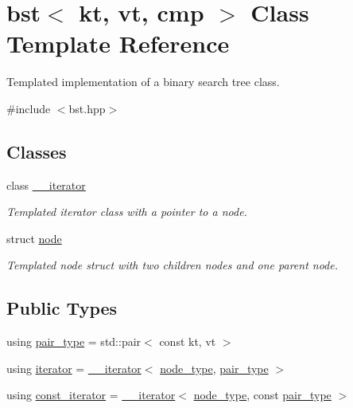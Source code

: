 \hypertarget{classbst}{}\section{bst$<$ kt, vt, cmp $>$ Class Template Reference}
\label{classbst}


Templated implementation of a binary search tree class.  




{\ttfamily \#include $<$bst.\+hpp$>$}

\subsection*{Classes}
\begin{DoxyCompactItemize}
\item 
class \hyperlink{classbst_1_1____iterator}{\+\_\+\+\_\+iterator}
\begin{DoxyCompactList}\small\item\em Templated iterator class with a pointer to a node. \end{DoxyCompactList}\item 
struct \hyperlink{structbst_1_1node}{node}
\begin{DoxyCompactList}\small\item\em Templated node struct with two children nodes and one parent node. \end{DoxyCompactList}\end{DoxyCompactItemize}
\subsection*{Public Types}
\begin{DoxyCompactItemize}
\item 
using \hyperlink{classbst_a7b11cca2a3b4394915600194f741ab16}{pair\+\_\+type} = std\+::pair$<$ const kt, vt $>$
\item 
using \hyperlink{classbst_a429b0445783ff6486882db5dee900ce0}{iterator} = \hyperlink{classbst_1_1____iterator}{\+\_\+\+\_\+iterator}$<$ \hyperlink{classbst_a062eb2a1ac54802dbc4f0f74ae2afd01}{node\+\_\+type}, \hyperlink{classbst_a7b11cca2a3b4394915600194f741ab16}{pair\+\_\+type} $>$
\item 
using \hyperlink{classbst_a72485696d999bf489c6156f6327a2163}{const\+\_\+iterator} = \hyperlink{classbst_1_1____iterator}{\+\_\+\+\_\+iterator}$<$ \hyperlink{classbst_a062eb2a1ac54802dbc4f0f74ae2afd01}{node\+\_\+type}, const \hyperlink{classbst_a7b11cca2a3b4394915600194f741ab16}{pair\+\_\+type} $>$
\end{DoxyCompactItemize}
